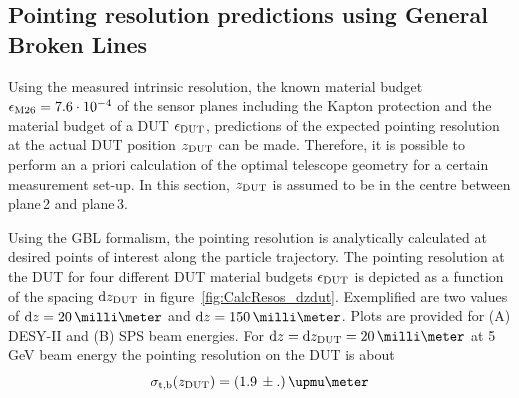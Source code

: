 


\subsection{Pointing resolution predictions using General Broken Lines}

% 
Using the measured intrinsic resolution, the known material budget $\mathnormal{\epsilon_{\textrm{M26}}} = 7.6\cdot 10^{-4}$ of the sensor planes including the Kapton protection and the material budget of a DUT $\mathnormal{\epsilon_{\textrm{DUT}}}$,
 predictions of the expected pointing resolution at the actual DUT position $z_{\textrm{DUT}}$ can be made. 
Therefore, it is possible to perform an a priori calculation of the optimal telescope geometry for a certain measurement set-up. 
In this section, $z_{\textrm{DUT}}$ is assumed to be in the centre between plane\,2 and plane\,3.


Using the GBL formalism, the pointing resolution is analytically calculated at desired points of interest along the particle trajectory. 
The pointing resolution at the DUT for four different DUT material budgets $\mathnormal{\epsilon_{\textrm{DUT}}}$ is depicted as a function of the spacing $\textrm{d}z_{\textrm{DUT}}$ in figure~\ref{fig:CalcResos_dzdut}.
Exemplified are two values of $\dz = 20\,\milli\meter$ and $\dz = 150\,\milli\meter$. 
Plots are provided for (A) DESY-II and (B) SPS beam energies. 
For $\dz = \dzdut = 20\,\milli\meter$ at 5\,GeV beam energy the pointing resolution on the DUT is about 
\begin{equation}
 \sigmatb(\zdut) = (1.9\,\pm .)\,\upmu\meter
\end{equation}

